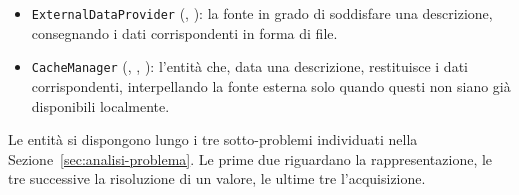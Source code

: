 \begin{itemize}
    \item \texttt{ExternalDataProvider} (, ): la fonte in grado di
    soddisfare una descrizione, consegnando i dati corrispondenti in forma di file.

    \item \texttt{CacheManager} (, , ): l'entità che, data una
    descrizione, restituisce i dati corrispondenti, interpellando la fonte esterna solo
    quando questi non siano già disponibili localmente.
\end{itemize}

Le entità si dispongono lungo i tre sotto-problemi individuati nella
Sezione~\ref{sec:analisi-problema}. Le prime due riguardano la rappresentazione, le tre
successive la risoluzione di un valore, le ultime tre l'acquisizione. 

